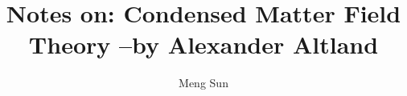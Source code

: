 \documentclass{tufte-book}
\title{Notes on: Condensed Matter Field Theory --by Alexander Altland}
\author{Meng Sun}
\begin{document}
\maketitle
\tableofcontents



{}

\end{document}
